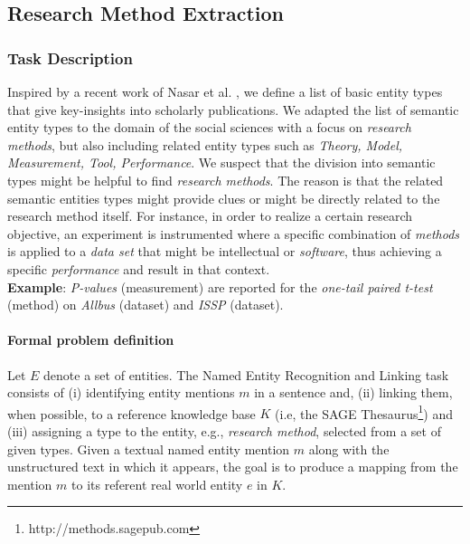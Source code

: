 \subsection{Research Method Extraction}
\label{sec:research_method_extraction}


\subsubsection{Task Description}
Inspired by a recent work of Nasar et al.
\cite{nasar2018information}, we define a list of basic entity types that give key-insights into scholarly publications. 
We adapted the list of semantic entity types to the domain of the social sciences with a focus on \textit{research methods},
but also including related entity types such as \textit{Theory, Model, Measurement, Tool, Performance}. We suspect that the division into semantic types might be helpful to find \textit{research methods}. The reason is that the related semantic entities types might provide clues or might be directly related to the research method itself.
For instance, in order to realize a certain research objective, an experiment is instrumented where a specific combination of \textit{methods} is applied to a \textit{data set} that might be intellectual or \textit{software}, thus achieving a specific \textit{performance} and result in that context.\\
\textbf{Example}: \textit{P-values} (measurement) are reported for the \textit{one-tail paired t-test} (method) on \textit{Allbus} (dataset) and \textit{ISSP} (dataset).\\


\paragraph{Formal problem definition}%
Let $E$ denote a set of entities. The Named Entity Recognition and Linking task consists of (i) identifying entity mentions  $m$ in a sentence and, (ii) linking them, when possible, to a  reference knowledge base  $K$ (i.e, the SAGE Thesaurus\footnote{http://methods.sagepub.com}) 
and (iii) assigning a type to the entity, e.g., \textit{research method}, selected from a set of given types. 
Given a textual named entity mention $m$ along with the unstructured text in which it appears, the goal is to produce a mapping from the mention  $m$ to its referent real world entity  $e$ in  $K$.

